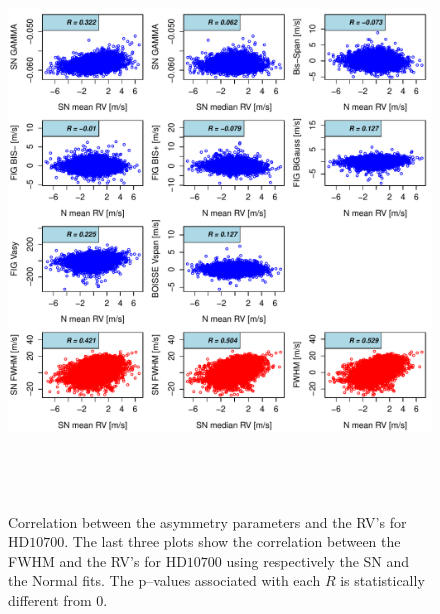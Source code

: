 \documentclass{aa}
\begin{document}
\begin{figure}[htbp]
   \centering
\includegraphics[height = 6in]{HD10700_[4]Comparison_para.pdf}  
   \caption{Correlation between the asymmetry parameters and the RV's for $\text{HD}10700$. The last three plots show the correlation between the FWHM and the RV's for $\text{HD}10700$ using respectively the SN and the Normal fits. The p--values associated with each $R$ is statistically different from $0$.}
   \label{fig:Tau:corrPlot}
\end{figure}
\end{document}
